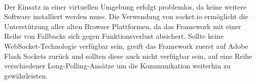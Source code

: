 \\Der Einsatz in einer virtuellen Umgebung erfolgt problemlos, da keine weitere Software installiert werden muss. Die Verwendung von socket.io ermöglicht die Unterstützung aller alten Browser Plattformen, da das \Gls{Framework} mit einer Reihe von Fallbacks sich gegen Funktionsverlust absichert. Sollte keine WebSocket-Technologie verfügbar sein, greift das \Gls{Framework} zuerst auf Adobe Flash Sockets zurück und sollten diese auch nicht verfügbar sein, auf eine Reihe verschiedener Long-Polling-Ansätze um die Kommunikation weiterhin zu gewährleisten.












